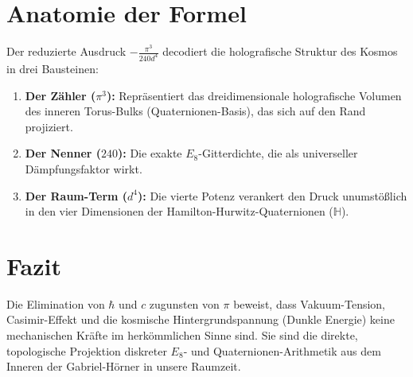 \documentclass[11pt,a4paper]{article}
\begin{document}
\section{Anatomie der Formel}
Der reduzierte Ausdruck $-\frac{\pi^3}{240 d^4}$ decodiert die holografische Struktur des Kosmos in drei Bausteinen:
\begin{enumerate}
    \item \textbf{Der Zähler ($\pi^3$):} Repräsentiert das dreidimensionale holografische Volumen des inneren Torus-Bulks (Quaternionen-Basis), das sich auf den Rand projiziert.
    \item \textbf{Der Nenner ($240$):} Die exakte $E_8$-Gitterdichte, die als universeller Dämpfungsfaktor wirkt.
    \item \textbf{Der Raum-Term ($d^4$):} Die vierte Potenz verankert den Druck unumstößlich in den vier Dimensionen der Hamilton-Hurwitz-Quaternionen ($\mathbb{H}$).
\end{enumerate}

\section{Fazit}
Die Elimination von $\hbar$ und $c$ zugunsten von $\pi$ beweist, dass Vakuum-Tension, Casimir-Effekt und die kosmische Hintergrundspannung (Dunkle Energie) keine mechanischen Kräfte im herkömmlichen Sinne sind. Sie sind die direkte, topologische Projektion diskreter $E_8$- und Quaternionen-Arithmetik aus dem Inneren der Gabriel-Hörner in unsere Raumzeit.
\end{document}
